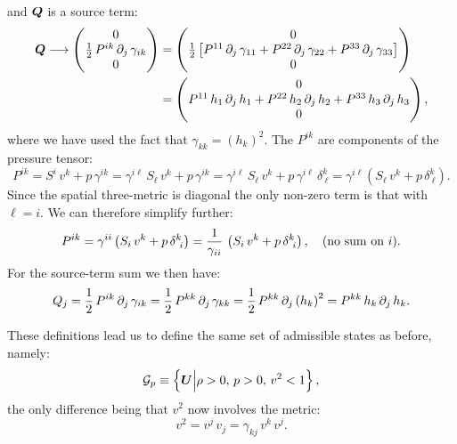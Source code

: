 \documentclass[10pt,preprint]{aastex}
\begin{document}
and $\bQ$ is a source term:
\begin{align}
    \bQ\longrightarrow\begin{pmatrix}0\\\f{1}{2}\,P^{ik}\,\pd{\,\gamma_{ik}}{j}\\0\end{pmatrix}&=\begin{pmatrix}0\\ \f{1}{2}\left[P^{11}\,\pd{\,\gamma_{11}}{j}+P^{22}\,\pd{\,\gamma_{22}}{j}+P^{33}\,\pd{\,\gamma_{33}}{j}\right] \\0\end{pmatrix}\\
    &=\begin{pmatrix}0\\ P^{11}\,h_{1}\,\pd{\,h_{1}}{j}+P^{22}\,h_{2}\,\pd{\,h_{2}}{j}+P^{33}\,h_{3}\,\pd{\,h_{3}}{j} \\0\end{pmatrix},
\end{align}
where we have used the fact that $\gamma_{kk}=\left(h_{k}\right)^{2}$. The $P^{ik}$ are components of the pressure tensor:
\begin{equation}
    P^{ik}=S^{i}\,v^{k}+p\,\gamma^{ik}=\gamma^{i\ell}\,S_{\ell}\,v^{k}+p\,\gamma^{ik}=\gamma^{i\ell}\,S_{\ell}\,v^{k}+p\,\gamma^{i\ell}\,\delta^{k}_{~\ell}=\gamma^{i\ell}\left(S_{\ell}\,v^{k}+p\,\delta^{k}_{~\ell}\right).
\end{equation}
Since the spatial three-metric is diagonal the only non-zero term is that with $\ell=i$. We can therefore simplify further:
\begin{equation}
    P^{ik}=\gamma^{ii}\left(S_{i}\,v^{k}+p\,\delta^{k}_{~i}\right)=\f{1}{\gamma_{ii}}\,\left(S_{i}\,v^{k}+p\,\delta^{k}_{~i}\right),\hspace{1em}\text{(no sum on $i$)}.
\end{equation}
For the source-term sum we then have:
\begin{equation}\label{Eq:PressureTensorSum}
    Q_{j}=\f{1}{2}\,P^{ik}\,\p_{j}\,\gamma_{ik}=\f{1}{2}\,P^{kk}\,\p_{j}\,\gamma_{kk}=\f{1}{2}\,P^{kk}\,\p_{j}\left(h_{k}\right)^{2}=P^{kk}\,h_{k}\,\p_{j}\,h_{k}.
\end{equation}

These definitions lead us to define the same set of admissible states as before, namely:
\begin{equation}
    \cG_{p}\equiv\left\{\bU\Big|\rho>0,\,p>0,\,v^{2}<1\right\},
\end{equation}
the only difference being that $v^{2}$ now involves the metric:
\begin{equation}
    v^{2}=v^{j}\,v_{j}=\gamma_{kj}\,v^{k}\,v^{j}.
\end{equation}
\end{document}

